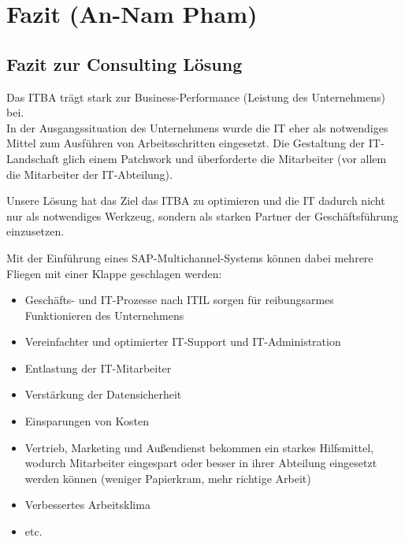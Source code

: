 \section{Fazit (An-Nam Pham)}
\subsection{Fazit zur Consulting Lösung}
Das \acrfull{ITBA} trägt stark zur Business-Performance (Leistung des Unternehmens) bei.\\
In der Ausgangssituation des Unternehmens wurde die IT eher als notwendiges Mittel zum Ausführen von Arbeitsschritten eingesetzt. Die Gestaltung der IT-Landschaft glich einem Patchwork und überforderte die Mitarbeiter (vor allem die Mitarbeiter der IT-Abteilung).

Unsere Lösung hat das Ziel das ITBA zu optimieren und die IT dadurch nicht nur als notwendiges Werkzeug, sondern als starken Partner der Geschäftsführung einzusetzen.

Mit der Einführung eines SAP-Multichannel-Systems können dabei mehrere Fliegen mit einer Klappe geschlagen werden:
\begin{itemize}
\item Geschäfts- und IT-Prozesse nach ITIL sorgen für reibungsarmes Funktionieren des Unternehmens
\item Vereinfachter und optimierter IT-Support und IT-Administration
\item Entlastung der IT-Mitarbeiter
\item Verstärkung der Datensicherheit
\item Einsparungen von Kosten
\item Vertrieb, Marketing und Außendienst bekommen ein starkes Hilfsmittel, wodurch Mitarbeiter eingespart oder besser in ihrer Abteilung eingesetzt werden können (\glqq weniger Papierkram, mehr richtige Arbeit\grqq)
\item Verbessertes Arbeitsklima
\item etc.
\end{itemize}
\newpage

